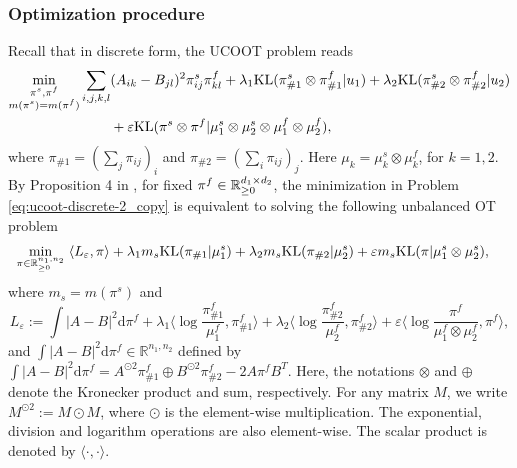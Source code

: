 \subsubsection{Optimization procedure}
Recall that in discrete form, the UCOOT problem reads
\begin{equation}
\begin{split}
    \label{eq:ucoot-discrete-2_copy}
  \min_{\substack{\pi^s, \pi^f \\
  m(\pi^s) = m(\pi^f)}} \sum_{i, j, k, l}
  &(A_{ik} - B_{jl})^2\pi^s_{ij}\pi^f_{kl} + \lambda_1 \text{KL}(\pi^s_{\#1} \otimes \pi^f_{\# 1} \vert u_1 )
  + \lambda_2 \text{KL}(\pi^s_{\# 2} \otimes \pi^f_{\# 2} \vert u_2) \\
  &+ \varepsilon \text{KL}( \pi^s \otimes \pi^f \vert \mu^s_1 \otimes \mu_2^s \otimes \mu_1^f \otimes \mu_2^f),
\end{split}
\end{equation}
where $\pi_{\# 1} = (\sum_j \pi_{ij})_i$ and $\pi_{\# 2} = (\sum_i \pi_{ij})_j$.
Here $\mu_k = \mu_k^s \otimes \mu_k^f$, for $k=1,2$. By Proposition 4 in \citep{Sejourne20},
for fixed $\pi^f \in \mathbb R^{d_1 \times d_2}_{\geq 0}$, the minimization in
Problem \eqref{eq:ucoot-discrete-2_copy} is equivalent to solving the following unbalanced OT problem
\begin{equation} \label{eq:ucoot_uot}
  \begin{split}
    \min_{\pi \in \mathbb R^{n_1, n_2}_{\geq 0}} & \; \langle L_{\varepsilon}, \pi \rangle
    + \lambda_1 m_s \text{KL}(\pi_{\#1} \vert \mu_1^s)
    + \lambda_2 m_s \text{KL}(\pi_{\#2} \vert \mu_2^s)
    + \varepsilon m_s \text{KL}(\pi \vert \mu^s_1 \otimes \mu_2^s),
  \end{split}
\end{equation}
where $m_s = m(\pi^s)$ and
\begin{equation} \label{ucoot:9}
  L_{\varepsilon} := \int \vert A - B \vert^2 \mathrm d \pi^f +
  \lambda_1 \langle \log \frac{\pi^f_{\#1}}{\mu_1^f}, \pi^f_{\#1} \rangle +
  \lambda_2 \langle \log \frac{\pi^f_{\#2}}{\mu_2^f}, \pi^f_{\#2} \rangle +
  \varepsilon \langle \log \frac{\pi^f}{\mu_1^f \otimes \mu_2^f}, \pi^f \rangle,
\end{equation}
and $\int \vert A - B \vert^2 \mathrm d \pi^f \in \mathbb R^{n_1, n_2}$ defined by
$\int \vert A - B \vert^2 \mathrm d\pi^f = A^{\odot 2} \pi^f_{\# 1} \oplus B^{\odot 2} \pi^f_{\# 2} - 2 A \pi^f B^T$.
Here, the notations $\otimes$ and $\oplus$ denote the Kronecker product and sum, respectively.
For any matrix $M$, we write $M^{\odot 2} := M \odot M$, where $\odot$ is
the element-wise multiplication. The exponential, division and logarithm operations are also
element-wise. The scalar product is denoted by $\langle \cdot, \cdot \rangle$.

